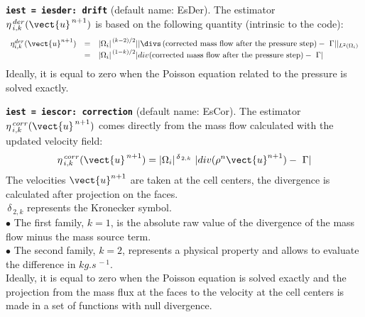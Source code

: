 {\tt \bf iest = iesder: drift}  (default name: EsDer).
The estimator $\eta^{\,der}_{\,i,k}(\vect{u}^{\,n+1})$ is based on the
following quantity (intrinsic to the code):
\begin{equation}
\begin{array}{lll}
 \eta^{der}_{i,k}(\vect{u}^{n+1})
&=& {|\Omega_i|}^{\,(k-2)/2}
||\divs \left(\text{corrected mass flow after the pressure step}\right)
                                              -\ \Gamma||_{{L}^{2}(\Omega_i)} \\
&=& {|\Omega_i|}^{\,(1-k)/2}
|div (\text{corrected mass flow after the pressure step})-\ \Gamma|
\end{array}
\end{equation}
Ideally, it is equal to zero when the Poisson equation related to the pressure is
solved exactly.

{\tt \bf iest = iescor: correction}  (default name: EsCor).
The estimator $ \eta^{\,corr}_{\,i,k}(\vect{u}^{\,n+1})$ comes directly
from the mass flow calculated with the updated velocity field:
\begin{eqnarray*}
            \eta^{\,corr}_{\,i,k}(\vect{u}^{\,n+1})=
|\Omega_i|^{\,\delta_{\,2,k}}\ |div (\rho^n \vect{u}^{n+1}) -\ \Gamma|
\end{eqnarray*}
The velocities $\vect{u}^{n+1}$ are taken at the cell centers,
the divergence is calculated after projection on the faces.\\
            $ \,\delta_{\,2,k}$ represents the Kronecker symbol.\\
\hspace*{0.5cm}$\bullet$ The first family, $k=1$, is the absolute raw
value of the divergence of the mass flow minus the mass source term.\\
\hspace*{0.5cm}$\bullet$ The second family, $k=2$, represents a physical
property and allows to evaluate the difference in $kg.s^{\,-1}$.\\
Ideally, it is equal to zero when the Poisson equation is solved exactly and
the projection from the mass flux at the faces to the velocity at the cell
centers is made in a set of  functions with null divergence.

